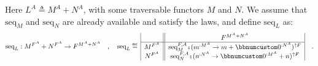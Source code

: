 Here $L^{A}\triangleq M^{A}+N^{A}$, with some traversable functors
$M$ and $N$. We assume that $\text{seq}_{M}$ and $\text{seq}_{N}$
are already available and satisfy the laws, and define $\text{seq}_{L}$
as:
\[
\text{seq}_{L}:M^{F^{A}}+N^{F^{A}}\rightarrow F^{M^{A}+N^{A}}\quad,\quad\text{seq}_{L}\triangleq\,\begin{array}{|c||c|}
 & F^{M^{A}+N^{A}}\\
\hline M^{F^{A}} & \text{seq}_{M}^{F,A}\bef(m^{:M^{A}}\rightarrow m+\bbnum 0^{:N^{A}})^{\uparrow F}\\
N^{F^{A}} & \text{seq}_{N}^{F,A}\bef(n^{:N^{A}}\rightarrow\bbnum 0^{:M^{A}}+n)^{\uparrow F}
\end{array}\quad.
\]

\begin{comment}
{*}{*}{*} do we need this? 

It helps to rewrite $\text{seq}_{L}$ as a composition of two matrices,
separating the functions lifted to $F$:
\begin{align*}
 & \text{seq}_{L}\triangleq\,\begin{array}{|c||cc|}
 & F^{M^{A}} & F^{N^{A}}\\
\hline M^{F^{A}} & \text{seq}_{M}^{F,A} & \bbnum 0\\
N^{F^{A}} & \bbnum 0 & \text{seq}_{N}^{F,A}
\end{array}\,\bef\,\begin{array}{|c||c|}
 & F^{M^{A}+N^{A}}\\
\hline F^{M^{A}} & (m^{:M^{A}}\rightarrow m+\bbnum 0^{:N^{A}})^{\uparrow F}\\
F^{N^{A}} & (n^{:N^{A}}\rightarrow\bbnum 0^{:M^{A}}+n)^{\uparrow F}
\end{array}\\
 & =\,\begin{array}{|c||cc|}
 & F^{M^{A}} & F^{N^{A}}\\
\hline M^{F^{A}} & \text{seq}_{M}^{F,A} & \bbnum 0\\
N^{F^{A}} & \bbnum 0 & \text{seq}_{N}^{F,A}
\end{array}\,\bef\,\begin{array}{|c||c|}
 & F^{M^{A}+N^{A}}\\
\hline F^{M^{A}} & (m^{:M^{A}}\rightarrow m+\bbnum 0^{:N^{A}})^{\uparrow F}\\
F^{N^{A}} & (n^{:N^{A}}\rightarrow\bbnum 0^{:M^{A}}+n)^{\uparrow F}
\end{array}\quad.
\end{align*}
\end{comment}

